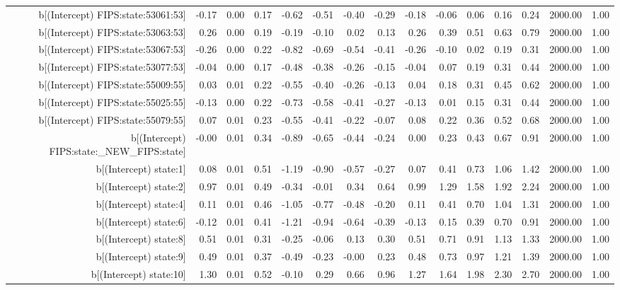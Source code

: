 \begin{table}[ht]
\begin{tabular}{rrrrrrrrrrrrrrr}
  b[(Intercept) FIPS:state:53061:53] & -0.17 & 0.00 & 0.17 & -0.62 & -0.51 & -0.40 & -0.29 & -0.18 & -0.06 & 0.06 & 0.16 & 0.24 & 2000.00 & 1.00 \\ 
  b[(Intercept) FIPS:state:53063:53] & 0.26 & 0.00 & 0.19 & -0.19 & -0.10 & 0.02 & 0.13 & 0.26 & 0.39 & 0.51 & 0.63 & 0.79 & 2000.00 & 1.00 \\ 
  b[(Intercept) FIPS:state:53067:53] & -0.26 & 0.00 & 0.22 & -0.82 & -0.69 & -0.54 & -0.41 & -0.26 & -0.10 & 0.02 & 0.19 & 0.31 & 2000.00 & 1.00 \\ 
  b[(Intercept) FIPS:state:53077:53] & -0.04 & 0.00 & 0.17 & -0.48 & -0.38 & -0.26 & -0.15 & -0.04 & 0.07 & 0.19 & 0.31 & 0.44 & 2000.00 & 1.00 \\ 
  b[(Intercept) FIPS:state:55009:55] & 0.03 & 0.01 & 0.22 & -0.55 & -0.40 & -0.26 & -0.13 & 0.04 & 0.18 & 0.31 & 0.45 & 0.62 & 2000.00 & 1.00 \\ 
  b[(Intercept) FIPS:state:55025:55] & -0.13 & 0.00 & 0.22 & -0.73 & -0.58 & -0.41 & -0.27 & -0.13 & 0.01 & 0.15 & 0.31 & 0.44 & 2000.00 & 1.00 \\ 
  b[(Intercept) FIPS:state:55079:55] & 0.07 & 0.01 & 0.23 & -0.55 & -0.41 & -0.22 & -0.07 & 0.08 & 0.22 & 0.36 & 0.52 & 0.68 & 2000.00 & 1.00 \\ 
  b[(Intercept) FIPS:state:\_NEW\_FIPS:state] & -0.00 & 0.01 & 0.34 & -0.89 & -0.65 & -0.44 & -0.24 & 0.00 & 0.23 & 0.43 & 0.67 & 0.91 & 2000.00 & 1.00 \\ 
  b[(Intercept) state:1] & 0.08 & 0.01 & 0.51 & -1.19 & -0.90 & -0.57 & -0.27 & 0.07 & 0.41 & 0.73 & 1.06 & 1.42 & 2000.00 & 1.00 \\ 
  b[(Intercept) state:2] & 0.97 & 0.01 & 0.49 & -0.34 & -0.01 & 0.34 & 0.64 & 0.99 & 1.29 & 1.58 & 1.92 & 2.24 & 2000.00 & 1.00 \\ 
  b[(Intercept) state:4] & 0.11 & 0.01 & 0.46 & -1.05 & -0.77 & -0.48 & -0.20 & 0.11 & 0.41 & 0.70 & 1.04 & 1.31 & 2000.00 & 1.00 \\ 
  b[(Intercept) state:6] & -0.12 & 0.01 & 0.41 & -1.21 & -0.94 & -0.64 & -0.39 & -0.13 & 0.15 & 0.39 & 0.70 & 0.91 & 2000.00 & 1.00 \\ 
  b[(Intercept) state:8] & 0.51 & 0.01 & 0.31 & -0.25 & -0.06 & 0.13 & 0.30 & 0.51 & 0.71 & 0.91 & 1.13 & 1.33 & 2000.00 & 1.00 \\ 
  b[(Intercept) state:9] & 0.49 & 0.01 & 0.37 & -0.49 & -0.23 & -0.00 & 0.23 & 0.48 & 0.73 & 0.97 & 1.21 & 1.39 & 2000.00 & 1.00 \\ 
  b[(Intercept) state:10] & 1.30 & 0.01 & 0.52 & -0.10 & 0.29 & 0.66 & 0.96 & 1.27 & 1.64 & 1.98 & 2.30 & 2.70 & 2000.00 & 1.00 \\ 

\end{tabular}
\end{table}
